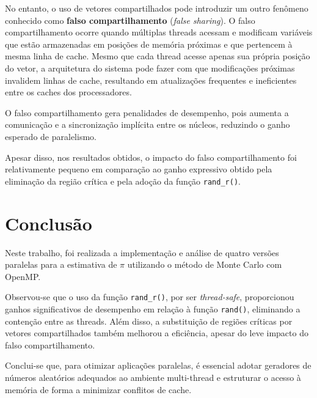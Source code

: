 \documentclass[a4paper, 12pt]{article}
\begin{document}
	No entanto, o uso de vetores compartilhados pode introduzir um outro fenômeno conhecido como \textbf{falso compartilhamento} (\textit{false sharing}). O falso compartilhamento ocorre quando múltiplas threads acessam e modificam variáveis que estão armazenadas em posições de memória próximas e que pertencem à mesma linha de cache. Mesmo que cada thread acesse apenas sua própria posição do vetor, a arquitetura do sistema pode fazer com que modificações próximas invalidem linhas de cache, resultando em atualizações frequentes e ineficientes entre os caches dos processadores.
	
	O falso compartilhamento gera penalidades de desempenho, pois aumenta a comunicação e a sincronização implícita entre os núcleos, reduzindo o ganho esperado de paralelismo.
	
	Apesar disso, nos resultados obtidos, o impacto do falso compartilhamento foi relativamente pequeno em comparação ao ganho expressivo obtido pela eliminação da região crítica e pela adoção da função \texttt{rand\_r()}.
	
	\section{Conclusão}
	
	Neste trabalho, foi realizada a implementação e análise de quatro versões paralelas para a estimativa de $\pi$ utilizando o método de Monte Carlo com OpenMP.
	
	Observou-se que o uso da função \texttt{rand\_r()}, por ser \textit{thread-safe}, proporcionou ganhos significativos de desempenho em relação à função \texttt{rand()}, eliminando a contenção entre as threads. Além disso, a substituição de regiões críticas por vetores compartilhados também melhorou a eficiência, apesar do leve impacto do falso compartilhamento.
	
	Conclui-se que, para otimizar aplicações paralelas, é essencial adotar geradores de números aleatórios adequados ao ambiente multi-thread e estruturar o acesso à memória de forma a minimizar conflitos de cache.
	
	
\end{document}
